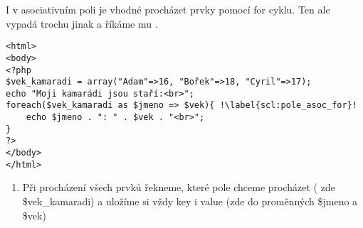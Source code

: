 I v asociativním poli je vhodné procházet prvky pomocí for cyklu. Ten ale vypadá trochu jinak a říkáme mu .\\ 

\begin{minipage}[t]{.45\textwidth}
\begin{code}
\begin{verbatim}
<html>
<body>
<?php
$vek_kamaradi = array("Adam"=>16, "Bořek"=>18, "Cyril"=>17);
echo "Moji kamarádi jsou staří:<br>";
foreach($vek_kamaradi as $jmeno => $vek){ !\label{scl:pole_asoc_for}!
	echo $jmeno . ": " . $vek . "<br>"; 
}
?>
</body>
</html> 
\end{verbatim}

\label{code:php_pole_asoc_foreach}
\end{code}
\end{minipage}
\begin{minipage}[t]{.45\textwidth}
\vspace{2.8cm}
\begin{enumerate}
\item[ř. \ref{scl:pole_asoc_for}:] Při procházení všech prvků řekneme, které pole chceme procházet ( zde \$vek\_kamaradi) a uložíme si vždy key i value (zde do proměnných \$jmeno a \$vek)
\end{enumerate}
\end{minipage}

